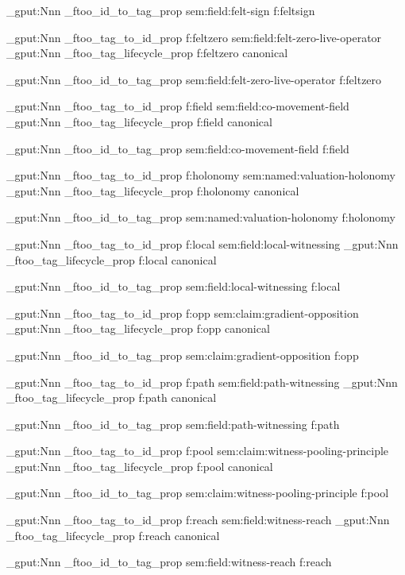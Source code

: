 \prop_gput:Nnn \g_ftoo_id_to_tag_prop { sem:field:felt-sign } { f:feltsign }


\prop_gput:Nnn \g_ftoo_tag_to_id_prop { f:feltzero } { sem:field:felt-zero-live-operator }
\prop_gput:Nnn \g_ftoo_tag_lifecycle_prop { f:feltzero } { canonical }

\prop_gput:Nnn \g_ftoo_id_to_tag_prop { sem:field:felt-zero-live-operator } { f:feltzero }


\prop_gput:Nnn \g_ftoo_tag_to_id_prop { f:field } { sem:field:co-movement-field }
\prop_gput:Nnn \g_ftoo_tag_lifecycle_prop { f:field } { canonical }

\prop_gput:Nnn \g_ftoo_id_to_tag_prop { sem:field:co-movement-field } { f:field }


\prop_gput:Nnn \g_ftoo_tag_to_id_prop { f:holonomy } { sem:named:valuation-holonomy }
\prop_gput:Nnn \g_ftoo_tag_lifecycle_prop { f:holonomy } { canonical }

\prop_gput:Nnn \g_ftoo_id_to_tag_prop { sem:named:valuation-holonomy } { f:holonomy }


\prop_gput:Nnn \g_ftoo_tag_to_id_prop { f:local } { sem:field:local-witnessing }
\prop_gput:Nnn \g_ftoo_tag_lifecycle_prop { f:local } { canonical }

\prop_gput:Nnn \g_ftoo_id_to_tag_prop { sem:field:local-witnessing } { f:local }


\prop_gput:Nnn \g_ftoo_tag_to_id_prop { f:opp } { sem:claim:gradient-opposition }
\prop_gput:Nnn \g_ftoo_tag_lifecycle_prop { f:opp } { canonical }

\prop_gput:Nnn \g_ftoo_id_to_tag_prop { sem:claim:gradient-opposition } { f:opp }


\prop_gput:Nnn \g_ftoo_tag_to_id_prop { f:path } { sem:field:path-witnessing }
\prop_gput:Nnn \g_ftoo_tag_lifecycle_prop { f:path } { canonical }

\prop_gput:Nnn \g_ftoo_id_to_tag_prop { sem:field:path-witnessing } { f:path }


\prop_gput:Nnn \g_ftoo_tag_to_id_prop { f:pool } { sem:claim:witness-pooling-principle }
\prop_gput:Nnn \g_ftoo_tag_lifecycle_prop { f:pool } { canonical }

\prop_gput:Nnn \g_ftoo_id_to_tag_prop { sem:claim:witness-pooling-principle } { f:pool }


\prop_gput:Nnn \g_ftoo_tag_to_id_prop { f:reach } { sem:field:witness-reach }
\prop_gput:Nnn \g_ftoo_tag_lifecycle_prop { f:reach } { canonical }

\prop_gput:Nnn \g_ftoo_id_to_tag_prop { sem:field:witness-reach } { f:reach }


